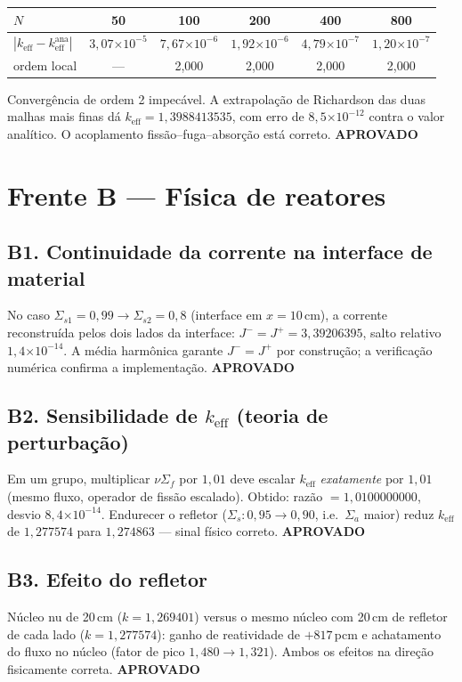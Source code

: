 \documentclass[11pt,a4paper]{article}
\newcommand{\keff}{k_{\text{eff}}}
\newcommand{\aprovado}{\textcolor{green!45!black}{\textbf{APROVADO}}}
\newcommand{\e}[1]{\ensuremath{\times 10^{#1}}}
\begin{document}
\begin{center}\small
\begin{tabular}{lccccc}
\toprule
$N$ & 50 & 100 & 200 & 400 & 800 \\
\midrule
$|\keff - \keff^{\text{ana}}|$ & $3{,}07\e{-5}$ & $7{,}67\e{-6}$ & $1{,}92\e{-6}$ & $4{,}79\e{-7}$ & $1{,}20\e{-7}$ \\
ordem local & --- & 2{,}000 & 2{,}000 & 2{,}000 & 2{,}000 \\
\bottomrule
\end{tabular}
\end{center}
Convergência de ordem 2 impecável. A extrapolação de Richardson das duas malhas
mais finas dá $\keff = 1{,}3988413535$, com erro de $8{,}5\e{-12}$ contra o
valor analítico. O acoplamento fissão--fuga--absorção está correto.
\hfill \aprovado

\section{Frente B --- Física de reatores}

\subsection{B1. Continuidade da corrente na interface de material}
No caso $\Sigma_{s1}=0{,}99 \to \Sigma_{s2}=0{,}8$ (interface em $x=10$\,cm),
a corrente reconstruída pelos dois lados da interface:
$J^- = J^+ = 3{,}39206395$, salto relativo $1{,}4\e{-14}$. A média harmônica
garante $J^-=J^+$ por construção; a verificação numérica confirma a
implementação. \hfill \aprovado

\subsection{B2. Sensibilidade de $\keff$ (teoria de perturbação)}
Em um grupo, multiplicar $\nu\Sigma_f$ por $1{,}01$ deve escalar $\keff$
\emph{exatamente} por $1{,}01$ (mesmo fluxo, operador de fissão escalado).
Obtido: razão $= 1{,}0100000000$, desvio $8{,}4\e{-14}$. Endurecer o refletor
($\Sigma_s\!: 0{,}95 \to 0{,}90$, i.e.\ $\Sigma_a$ maior) reduz $\keff$ de
$1{,}277574$ para $1{,}274863$ --- sinal físico correto. \hfill \aprovado

\subsection{B3. Efeito do refletor}
Núcleo nu de 20\,cm ($k = 1{,}269401$) versus o mesmo núcleo com 20\,cm de
refletor de cada lado ($k = 1{,}277574$): ganho de reatividade de
$+817$\,pcm e achatamento do fluxo no núcleo (fator de pico
$1{,}480 \to 1{,}321$). Ambos os efeitos na direção fisicamente correta.
\hfill \aprovado
\end{document}
